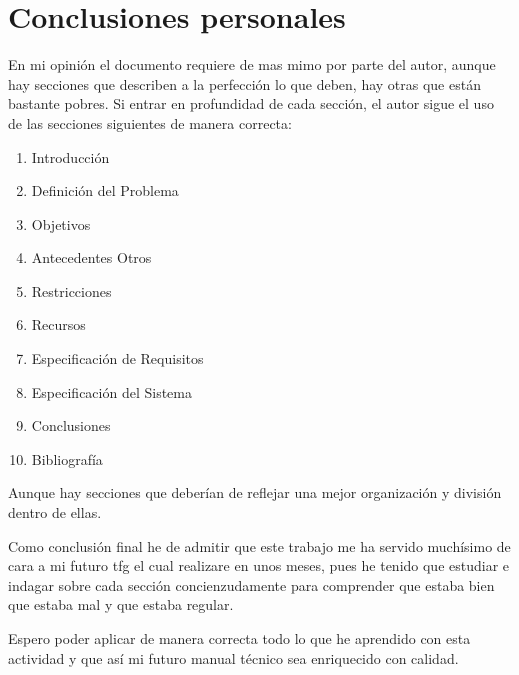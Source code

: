 \chapter{Conclusiones personales}

En mi opinión el documento requiere de mas mimo por parte del autor, aunque hay secciones que describen a la perfección lo que deben, hay otras que están bastante pobres. Si entrar en profundidad de cada sección, el autor sigue el uso de las secciones siguientes de manera correcta:

\begin{enumerate}
    \item Introducción 
    \item Definición del Problema 
    \item Objetivos 
    \item Antecedentes Otros
    \item Restricciones
    \item Recursos
    \item Especificación de Requisitos
    \item Especificación del Sistema
    \item Conclusiones
    \item Bibliografía
\end{enumerate}

Aunque hay secciones que deberían de reflejar una mejor organización y división dentro de ellas.

Como conclusión final he de admitir que este trabajo me ha servido muchísimo de cara a mi futuro tfg el cual realizare en unos meses, pues he tenido que estudiar e indagar sobre cada sección concienzudamente para comprender que estaba bien que estaba mal y que estaba regular. 

Espero poder aplicar de manera correcta todo lo que he aprendido con esta actividad y que así mi futuro manual técnico sea enriquecido con calidad.